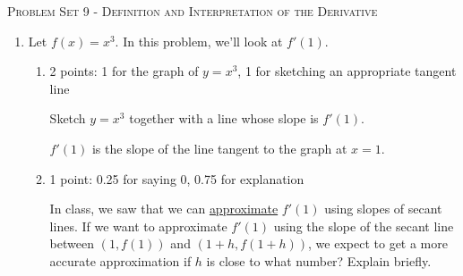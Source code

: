 \documentclass{article}
\begin{document}
\begin{center}
  \large\textsc{Problem Set 9 - Definition and Interpretation of the Derivative}
\end{center}


\begin{enumerate}
\item Let $f(x) = x^3$. In this problem, we'll look at $f'(1)$.

  \begin{enumerate}
  \item

    \begin{grading}
      2 points: 1 for the graph of $y = x^3$, 1 for sketching an appropriate tangent line 
    \end{grading}

    \begin{problem}[\stretch{1.25}]
      Sketch $y = x^3$ together with a line whose slope is $f'(1)$.
    \end{problem}

    \begin{solution}
      $f'(1)$ is the slope of the line tangent to the graph at $x=1$. 
      
    \end{solution}

  \item \label{approximate-derivative-values-of-h}

    \begin{grading}
      1 point: 0.25 for saying 0, 0.75 for explanation 
    \end{grading}

    \begin{problem}[0.75in]
      In class, we saw that we can \uline{approximate} $f'(1)$ using slopes of secant lines. If we want to approximate $f'(1)$ using the slope of the secant line between $(1, f(1))$ and $(1 + h, f(1 + h))$, we expect to get a more accurate approximation if $h$ is close to what number? Explain briefly.
    \end{problem}


\end{enumerate}
\end{enumerate}
\end{document}
